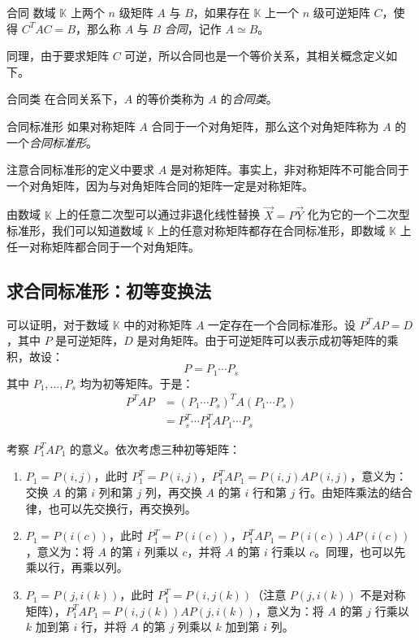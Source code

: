\begin{definition}{合同}
	数域 $\mathbb K$ 上两个 $n$ 级矩阵 $A$ 与 $B$，如果存在 $\mathbb K$ 上一个 $n$ 级可逆矩阵 $C$，使得 $C^T AC = B$，那么称 $A$ 与 $B$ \emph{合同}，记作 $A \simeq B$。
\end{definition}

同理，由于要求矩阵 $C$ 可逆，所以合同也是一个等价关系，其相关概念定义如下。

\begin{definition}{合同类}
	在合同关系下，$A$ 的等价类称为 $A$ 的\emph{合同类}。
\end{definition}

\begin{definition}{合同标准形}
	如果对称矩阵 $A$ 合同于一个对角矩阵，那么这个对角矩阵称为 $A$ 的一个\emph{合同标准形}。
\end{definition}

注意合同标准形的定义中要求 $A$ 是对称矩阵。事实上，非对称矩阵不可能合同于一个对角矩阵，因为与对角矩阵合同的矩阵一定是对称矩阵。

由数域 $\mathbb K$ 上的任意二次型可以通过非退化线性替换 $\vec X = P \vec Y$ 化为它的一个二次型标准形，我们可以知道数域 $\mathbb K$ 上的任意对称矩阵都存在合同标准形，即数域 $\mathbb K$ 上任一对称矩阵都合同于一个对角矩阵。

\subsection{求合同标准形：初等变换法}

可以证明，对于数域 $\mathbb K$ 中的对称矩阵 $A$ 一定存在一个合同标准形。设 $P^T A P = D$，其中 $P$ 是可逆矩阵，$D$ 是对角矩阵。由于可逆矩阵可以表示成初等矩阵的乘积，故设：
$$
P = P_1 \cdots P_s
$$
其中 $P_1, \ldots, P_s$ 均为初等矩阵。于是：
$$
\begin{aligned}
	P^T A P &= (P_1 \cdots P_s)^T A (P_1 \cdots P_s)
	\\&=
	P_s^T \cdots P_1^T A P_1 \cdots P_s
\end{aligned}
$$

考察 $P_1^T A P_1$ 的意义。依次考虑三种初等矩阵：
\begin{enumerate}
	\item $P_1 = P(i, j)$，此时 $P_1^T = P(i, j)$，$P_1^T A P_1 = P(i, j) A P(i, j)$，意义为：交换 $A$ 的第 $i$ 列和第 $j$ 列，再交换 $A$ 的第 $i$ 行和第 $j$ 行。由矩阵乘法的结合律，也可以先交换行，再交换列。
	\item $P_1 = P(i(c))$，此时 $P_1^T = P(i(c))$，$P_1^T A P_1 = P(i(c)) A P(i(c))$，意义为：将 $A$ 的第 $i$ 列乘以 $c$，并将 $A$ 的第 $i$ 行乘以 $c$。同理，也可以先乘以行，再乘以列。
	\item $P_1 = P(j, i(k))$，此时 $P_1^T = P(i, j(k))$（注意 $P(j, i(k))$ 不是对称矩阵），$P_1^T A P_1 = P(i, j(k)) A P(j, i(k))$，意义为：将 $A$ 的第 $j$ 行乘以 $k$ 加到第 $i$ 行，并将 $A$ 的第 $j$ 列乘以 $k$ 加到第 $i$ 列。
\end{enumerate}

